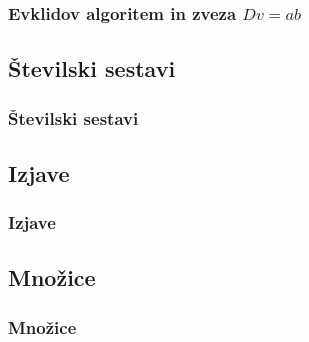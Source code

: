         \begin{frame}
            \frametitle{Evklidov algoritem in zveza $Dv=ab$}
        \end{frame}

    \subsection{Številski sestavi}

        \begin{frame}
            \frametitle{Številski sestavi}
        \end{frame}

    \subsection{Izjave}

        \begin{frame}
            \frametitle{Izjave}
        \end{frame}
        
    \subsection{Množice}

        \begin{frame}
            \frametitle{Množice}
        \end{frame}